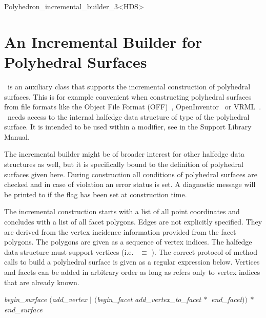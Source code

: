 \newpage
\ccHtmlNoClassToc
\begin{ccClassTemplate}{Polyhedron_incremental_builder_3<HDS>}
\section{An Incremental Builder for Polyhedral Surfaces}
\label{sectionPolyIncrBuilder}


\ccDefinition  

\ccClassTemplateName\ is an auxiliary class that supports the
incremental construction of polyhedral surfaces. This is for example
convenient when constructing polyhedral surfaces from file formats
like the Object File Format (OFF)~\cite{p-gmgv15-94},
OpenInventor~\cite{w-impoo-94} or VRML~\cite{bpp-vrml-95,vrmls-96}.
\ccClassTemplateName\ needs access to the internal halfedge data
structure of type  of the polyhedral surface. It is intended
to be used within a modifier, see  in the
Support Library Manual.

The incremental builder might be of broader interest for other
halfedge data structures as well, but it is specifically bound to the
definition of polyhedral surfaces given here. During construction all
conditions of polyhedral surfaces are checked and in case of violation
an error status is set. A diagnostic message will be printed to
 if the  flag has been set at construction time.

The incremental construction starts with a list of all point
coordinates and concludes with a list of all facet polygons. Edges are
not explicitly specified. They are derived from the vertex incidence
information provided from the facet polygons. The polygons are given as a
sequence of vertex indices.  The halfedge data structure  must
support vertices (i.e.~ $\equiv$
). The correct protocol of method calls to build a
polyhedral surface is given as a regular expression below. Vertices and
facets can be added in arbitrary order as long as
 refers only to vertex indices that are
already known.

{\it
    \hspace*{6mm} begin\_surface $($add\_vertex $|$ 
                  $($begin\_facet add\_vertex\_to\_facet$\:*$
                            end\_facet\/$))\:*$ end\_surface
}


\end{ccClassTemplate}
